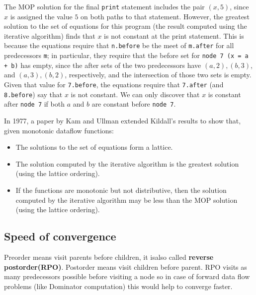 The MOP solution for the final \texttt{print} statement includes the pair $(x,5)$,
since $x$ is assigned the value $5$ on both paths to that statement. However,
the greatest solution to the set of equations for this program (the result
computed using the iterative algorithm) finds that $x$ is not constant at the
print statement. This is because the equations require that \texttt{n.before} be the
meet of \texttt{m.after} for all predecessors \texttt{m}; in particular, they require that
the {\color{red} before} set for  \texttt{node 7 (x = a + b)}
has empty, since the {\color{red} after} sets
of the two predecessors have $(a,2), (b,3)$, and $(a,3), (b,2)$, respectively,
and the intersection of those two sets is empty. Given that value for
\texttt{7.before}, the equations require that \texttt{7.after} (and \texttt{8.before}) say that
$x$ is not constant. We can only discover that $x$ is constant after \texttt{node 7}
if both $a$ and $b$ are constant before \texttt{node 7}.




In 1977, a paper by Kam and Ullman\cite{kam1977monotone}
extended Kildall's results to show that, given monotonic dataflow functions:

\begin{itemize}
	\item The solutions to the set of equations form a lattice.
	\item The solution computed by the iterative algorithm is the greatest solution (using the lattice ordering).
	\item If the functions are monotonic but not distributive, then the solution computed by the iterative algorithm may be less than the MOP solution (using the lattice ordering).
\end{itemize}



\subsection{Speed of convergence}

Preorder means visit parents before children, it isalso called \textbf{reverse postorder(RPO)}. Postorder means visit children before parent.
RPO visits as many predecessors possible before visiting a node so in case of forward data flow problems (like Dominator computation) this would help to converge faster.




